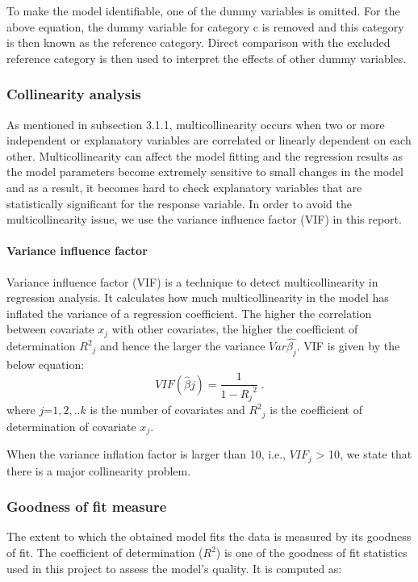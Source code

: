 \documentclass[12 pt]{scrartcl}
\begin{document}
To make the model identifiable, one of the dummy variables is omitted. For the above equation, the dummy variable for category c is removed and this category is then known as the reference category. Direct comparison with the excluded reference category is then used to interpret the effects of other dummy variables.\citep[p.~97]{regression}

\subsubsection{Collinearity analysis}

As mentioned in subsection 3.1.1, multicollinearity occurs when two or more independent or explanatory variables are correlated or linearly dependent on each other. Multicollinearity can affect the model fitting and the regression results as the model parameters become extremely sensitive to small changes in the model and as a result, it becomes hard to check explanatory variables that are statistically significant for the response variable. In order to avoid the multicollinearity issue, we use the variance influence factor (VIF) in this report. 
\paragraph{Variance influence factor}
Variance influence factor (VIF) is a technique to detect multicollinearity in regression analysis. It calculates how much multicollinearity in the model has inflated the variance of a regression coefficient. The higher the correlation between covariate $x_j$ with other covariates, the higher the coefficient of determination ${{R^2}_j}$ and hence the larger the variance $Var{\hat{\beta_j}}$. VIF is given by the below equation:
\[
VIF(\hat{\beta}j) = \frac{1}{1-{R_j}^2}\;. 
\]
where $j$=${1,2,..k}$ is the number of covariates and ${{R^2}_j}$ is the coefficient of determination of covariate ${x_j}$.

When the variance inflation factor is larger than 10, i.e., ${VIF_j}$ > 10, we state that there is a major collinearity problem.\citep[p.~157-158]{regression}

\subsubsection{Goodness of fit measure}

The extent to which the obtained model fits the data is measured by its goodness of fit. The coefficient of determination ($R^2$) is one of the goodness of fit statistics used in this project to assess the model's quality. It is computed as:	
\end{document}
